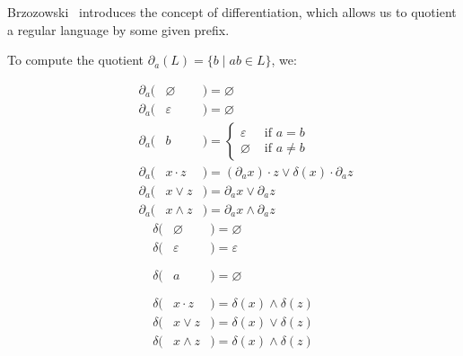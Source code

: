 \documentclass[sigplan,review,acmsmall,nonacm,screen,anonymous]{acmart}\settopmatter{printfolios=false,printccs=false,printacmref=false}
\begin{document}
Brzozowski~\cite{brzozowski1964derivatives} introduces the concept of differentiation, which allows us to quotient a regular language by some given prefix.

\begin{definition}[Brzozowski, 1964]
  To compute the quotient \(\partial_a(L) = \{b \mid ab \in L\}\), we:

  \vspace{-0.8cm}
  \begin{multicols}{2}
    \begin{eqnarray*}
      \phantom{--}\partial_a(& \varnothing &) = \varnothing                                           \\
      \phantom{--}\partial_a(& \varepsilon &) = \varnothing                                           \\
      \phantom{--}\partial_a(& b           &) = \begin{cases}\varepsilon &\text{ if } a = b\\ \varnothing &\text{ if } a \neq b \end{cases}\\
      \phantom{--}\partial_a(& x\cdot z    &) = (\partial_a x)\cdot z \vee \delta(x)\cdot\partial_a z \\
      \phantom{--}\partial_a(& x\vee  z    &) =  \partial_a x \vee  \partial_a z                       \\
      \phantom{--}\partial_a(& x\land z    &) =  \partial_a x \land \partial_a z
    \end{eqnarray*} \break\vspace{-0.45cm}
    \begin{eqnarray*}
      \delta(& \varnothing &) = \varnothing                                      \\
      \delta(& \varepsilon &) = \varepsilon                                      \\
      \delta(& a           &) = \varnothing\phantom{\begin{cases}\varepsilon\\\varnothing\end{cases}}\\
      \delta(& x\cdot z    &) = \delta(x) \land \delta(z)                        \\
      \delta(& x\vee  z    &) = \delta(x) \vee  \delta(z)                        \\
      \delta(& x\land z    &) = \delta(x) \land \delta(z)
    \end{eqnarray*}
  \end{multicols}
\end{definition}
\end{document}
